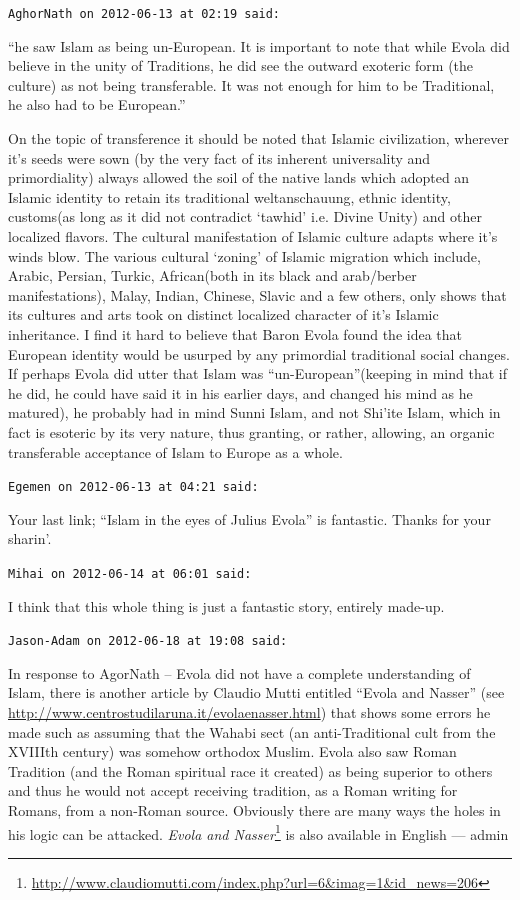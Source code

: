 \begin{footnotesize}
\begin{sffamily}
\hfill

\texttt{AghorNath on 2012-06-13 at 02:19 said:}

``he saw Islam as being un-European. It is important to note that while Evola did believe in the unity of Traditions, he did see the outward exoteric form (the culture) as not being transferable. It was not enough for him to be Traditional, he also had to be European.''

On the topic of transference it should be noted that Islamic civilization, wherever it's seeds were sown (by the very fact of its inherent universality and primordiality) always allowed the soil of the native lands which adopted an Islamic identity to retain its traditional weltanschauung, ethnic identity, customs(as long as it did not contradict `tawhid' i.e. Divine Unity) and other localized flavors. The cultural manifestation of Islamic culture adapts where it's winds blow. The various cultural `zoning' of Islamic migration which include, Arabic, Persian, Turkic, African(both in its black and arab/berber manifestations), Malay, Indian, Chinese, Slavic and a few others, only shows that its cultures and arts took on distinct localized character of it's Islamic inheritance. I find it hard to believe that Baron Evola found the idea that European identity would be usurped by any primordial traditional social changes. If perhaps Evola did utter that Islam was ``un-European''(keeping in mind that if he did, he could have said it in his earlier days, and changed his mind as he matured), he probably had in mind Sunni Islam, and not Shi'ite Islam, which in fact is esoteric by its very nature, thus granting, or rather, allowing, an organic transferable acceptance of Islam to Europe as a whole.

\hfill

\texttt{Egemen on 2012-06-13 at 04:21 said:}

Your last link; ``Islam in the eyes of Julius Evola'' is fantastic. Thanks for your sharin'.

\hfill

\texttt{Mihai on 2012-06-14 at 06:01 said:}

I think that this whole thing is just a fantastic story, entirely made-up.

\hfill

\texttt{Jason-Adam on 2012-06-18 at 19:08 said:}

In response to AgorNath -- Evola did not have a complete understanding of Islam, there is another article by Claudio Mutti entitled ``Evola and Nasser'' (see \url{http://www.centrostudilaruna.it/evolaenasser.html}) that shows some errors he made such as assuming that the Wahabi sect (an anti-Traditional cult from the XVIIIth century) was somehow orthodox Muslim. Evola also saw Roman Tradition (and the Roman spiritual race it created) as being superior to others and thus he would not accept receiving tradition, as a Roman writing for Romans, from a non-Roman source. Obviously there are many ways the holes in his logic can be attacked. \textit{Evola and Nasser}\footnote{\url{http://www.claudiomutti.com/index.php?url=6&imag=1&id\_news=206}} is also available in English --- admin \hfill


\end{sffamily}
\end{footnotesize}
